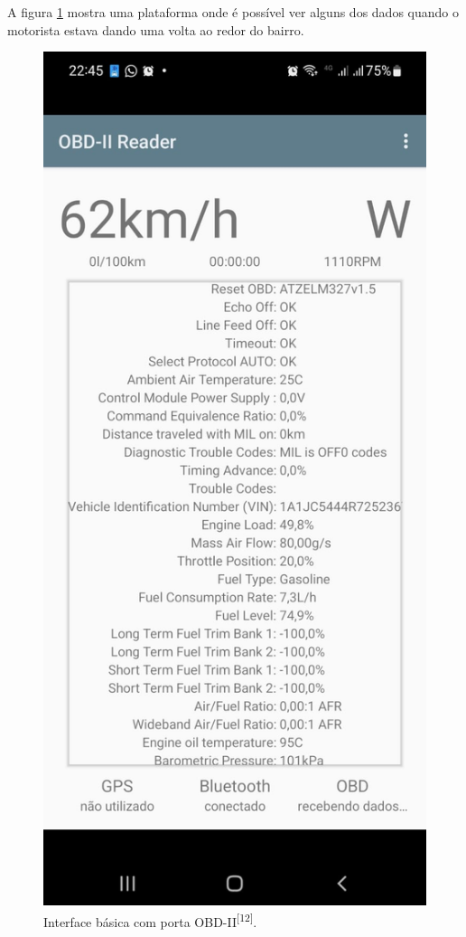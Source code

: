     A figura \ref{fig:obd2_plataforma} mostra uma plataforma onde é possível ver alguns dos dados quando o motorista estava dando uma volta ao redor do bairro.

\begin{figure}[hp]
    \centering
    
    \includegraphics[scale=0.3]{figures/obd2.jpg}
    
    \caption{Interface básica com porta OBD-II\textsuperscript{[12]}.}
    
    \label{fig:obd2_plataforma}
\end{figure}
    
